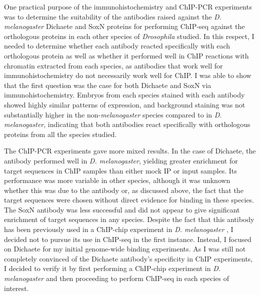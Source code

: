 One practical purpose of the immunohistochemistry and ChIP-PCR experiments was to determine the suitability of the antibodies raised against the \emph{D. melanogaster} Dichaete and SoxN proteins for performing ChIP-seq against the orthologous proteins in each other species of \emph{Drosophila} studied. In this respect, I needed to determine whether each antibody reacted specifically with each orthologous protein as well as whether it performed well in ChIP reactions with chromatin extracted from each species, as antibodies that work well for immunohistochemistry do not necessarily work well for ChIP. I was able to show that the first question was the case for both Dichaete and SoxN via immunohistochemistry. Embryos from each species stained with each antibody showed highly similar patterns of expression, and background staining was not substantially higher in the non-\emph{melanogaster} species compared to in \emph{D. melanogaster}, indicating that both antibodies react specifically with orthologous proteins from all the species studied.

The ChIP-PCR experiments gave more mixed results. In the case of Dichaete, the antibody performed well in \emph{D. melanogaster}, yielding greater enrichment for target sequences in ChIP samples than either mock IP or input samples. Its performance was more variable in other species, although it was unknown whether this was due to the antibody or, as discussed above, the fact that the target sequences were chosen without direct evidence for binding in these species. The SoxN antibody was less successful and did not appear to give significant enrichment of target sequences in any species. Despite the fact that this antibody has been previously used in a ChIP-chip experiment in \emph{D. melanogaster} \citep{ferrero_soxneuro_2014}, I decided not to pursue its use in ChIP-seq in the first instance. Instead, I focused on Dichaete for my initial genome-wide binding experiments. As I was still not completely convinced of the Dichaete antibody's specificity in ChIP experiments, I decided to verify it by first performing a ChIP-chip experiment in \emph{D. melanogaster} and then proceeding to perform ChIP-seq in each species of interest.
 

